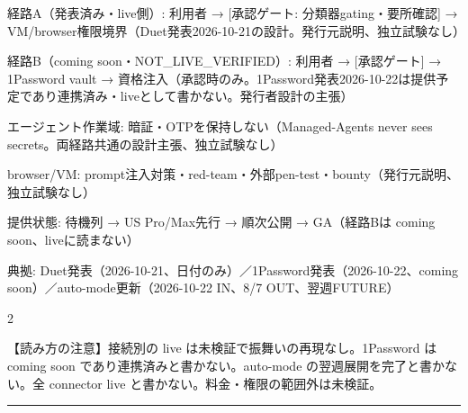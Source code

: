 \documentclass[lualatex,a4paper,10pt]{jlreq}
\begin{document}
{\centering
\begin{tcolorbox}[colback=SurveySoft,colframe=SurveyAccent,arc=1mm,boxrule=0.4pt,left=2mm,right=2mm,title={資格・承認フロー}]
{\footnotesize 
経路A（発表済み・live側）: 利用者 → [承認ゲート: 分類器gating・要所確認] → VM/browser権限境界（Duet発表2026-10-21の設計。発行元説明、独立試験なし）\par
経路B（coming soon・NOT\_LIVE\_VERIFIED）: 利用者 → [承認ゲート] → 1Password vault → 資格注入（承認時のみ。1Password発表2026-10-22は提供予定であり連携済み・liveとして書かない。発行者設計の主張）\par
エージェント作業域: 暗証・OTPを保持しない（Managed-Agents never sees secrets。両経路共通の設計主張、独立試験なし）\par
browser/VM: prompt注入対策・red-team・外部pen-test・bounty（発行元説明、独立試験なし）\par
提供状態: 待機列 → US Pro/Max先行 → 順次公開 → GA（経路Bは coming soon、liveに読まない）\par
典拠: Duet発表（2026-10-21、日付のみ）／1Password発表（2026-10-22、coming soon）／auto-mode更新（2026-10-22 IN、8/7 OUT、翌週FUTURE）\par
\par}
\end{tcolorbox}
} %
\begin{multicols}{2} %


\begin{tcolorbox}[colback=SurveySoft,colframe=SurveyRule,arc=1mm,boxrule=0.4pt,left=2mm,right=2mm]
【読み方の注意】接続別の live は未検証で振舞いの再現なし。1Password は coming soon であり連携済みと書かない。auto-mode の翌週展開を完了と書かない。全 connector live と書かない。料金・権限の範囲外は未検証。

\end{tcolorbox}


\end{multicols} %
\bigskip\hrule\bigskip %
\end{document}
